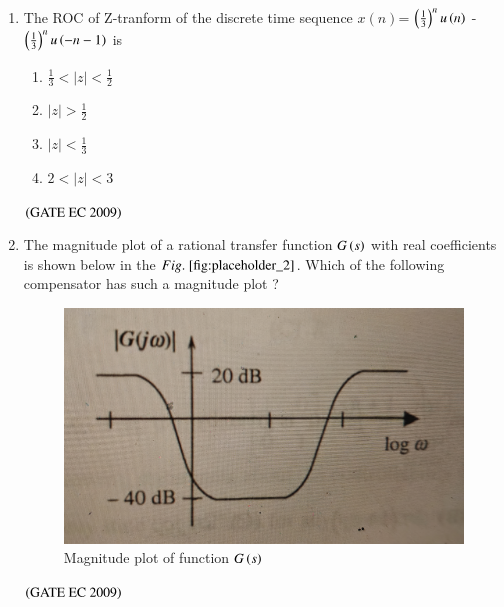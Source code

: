 \documentclass[journal,12pt,onecolumn]{IEEEtran}
\theoremstyle{remark}
\begin{document}
\begin{enumerate}
\item The ROC of Z-tranform of the discrete time sequence $x(n)$= $\brak{\frac{1}{3}}^n u\brak{n}$ - $\brak{\frac{1}{3}}^n u\brak{-n-1}$ is 
\begin{enumerate}
\item $\frac{1}{3} <|z| <\frac{1}{2}$
\item $|z| >\frac{1}{2}$
\item $|z| <\frac{1}{3}$
\item $2<|z|<3$
\end{enumerate}
\hfill $\brak{\text{GATE EC 2009}}$

\item The magnitude plot of a rational transfer function $G\brak{s}$ with real coefficients is shown below in the $\figref{fig:placeholder_2}$. Which of the following compensator has such a magnitude plot ?
\begin{figure}[H]
    \centering
    \includegraphics[width=0.5\columnwidth]{figs/fig_2.jpg}
    \caption{\centering Magnitude plot of function $G\brak{s}$ }
    \label{fig:placeholder_2}
\end{figure}
\begin{enumerate}
\end{enumerate}
\hfill $\brak{\text{GATE EC 2009}}$


\end{enumerate}
\end{document}
